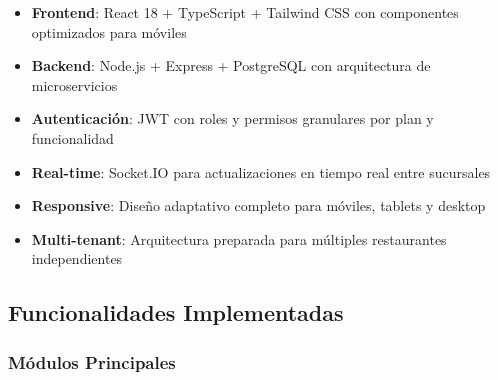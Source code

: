 \documentclass[12pt,a4paper]{article}
\begin{document}
\begin{itemize}
    \item \textbf{Frontend}: React 18 + TypeScript + Tailwind CSS con componentes optimizados para móviles
    \item \textbf{Backend}: Node.js + Express + PostgreSQL con arquitectura de microservicios
    \item \textbf{Autenticación}: JWT con roles y permisos granulares por plan y funcionalidad
    \item \textbf{Real-time}: Socket.IO para actualizaciones en tiempo real entre sucursales
    \item \textbf{Responsive}: Diseño adaptativo completo para móviles, tablets y desktop
    \item \textbf{Multi-tenant}: Arquitectura preparada para múltiples restaurantes independientes
\end{itemize}

\subsection{Funcionalidades Implementadas}

\subsubsection{Módulos Principales}
\end{document}
